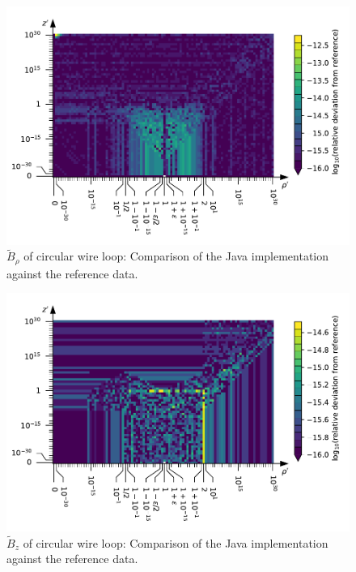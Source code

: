 \begin{figure}[htbp]
 \centering
 \includegraphics{img/CircularWireLoop_B_rho_Java.pdf}
 \caption{$\tilde{B}_\rho$ of circular wire loop: Comparison of the Java implementation against the reference data.}
 \label{fig:CircularWireLoop_B_rho_Java}
\end{figure}

\begin{figure}[htbp]
 \centering
 \includegraphics{img/CircularWireLoop_B_z_Java.pdf}
 \caption{$\tilde{B}_z$ of circular wire loop: Comparison of the Java implementation against the reference data.}
 \label{fig:CircularWireLoop_B_z_Java}
\end{figure}
